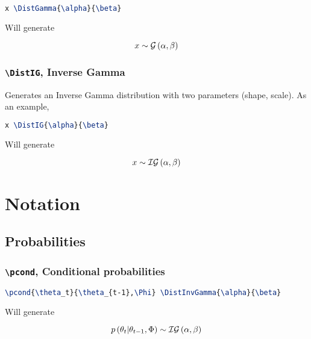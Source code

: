 \documentclass[]{article}
\begin{document}
\begin{lstlisting}[language=TeX]
x \DistGamma{\alpha}{\beta}
\end{lstlisting}

Will generate

\[ x \sim \mathcal{G} \left(\alpha,\beta\right) \]

\subsubsection{\texttt{\textbackslash DistIG}, Inverse Gamma}

Generates an Inverse Gamma distribution with two parameters (shape, scale).
As an example,

\begin{lstlisting}[language=TeX]
x \DistIG{\alpha}{\beta}
\end{lstlisting}

Will generate

\[ x \sim \mathcal{IG} \left( \alpha,\beta \right) \]

\section{Notation}

\subsection{Probabilities}

\subsubsection{\texttt{\textbackslash pcond}, Conditional probabilities}

\begin{lstlisting}[language=TeX]
\pcond{\theta_t}{\theta_{t-1},\Phi} \DistInvGamma{\alpha}{\beta}
\end{lstlisting}

Will generate

\[ p\left(\theta_t|\theta_{t-1},\Phi\right) \sim \mathcal{IG} \left( \alpha,\beta \right) \]
\end{document}
